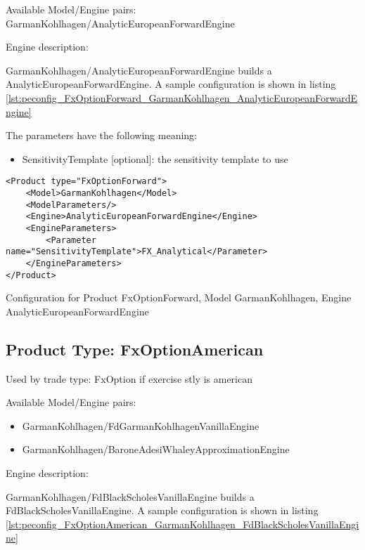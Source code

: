 Available Model/Engine pairs: GarmanKohlhagen/AnalyticEuropeanForwardEngine

Engine description:

GarmanKohlhagen/AnalyticEuropeanForwardEngine builds a AnalyticEuropeanForwardEngine. A sample configuration is shown in listing
\ref{lst:peconfig_FxOptionForward_GarmanKohlhagen_AnalyticEuropeanForwardEngine}

The parameters have the following meaning:

\begin{itemize}
\item SensitivityTemplate [optional]: the sensitivity template to use
\end{itemize}

\begin{longlisting}
\begin{verbatim}
<Product type="FxOptionForward">
    <Model>GarmanKohlhagen</Model>
    <ModelParameters/>
    <Engine>AnalyticEuropeanForwardEngine</Engine>
    <EngineParameters>
        <Parameter name="SensitivityTemplate">FX_Analytical</Parameter>
    </EngineParameters>
</Product>
\end{verbatim}
\caption{Configuration for Product FxOptionForward, Model GarmanKohlhagen, Engine AnalyticEuropeanForwardEngine}
\label{lst:peconfig_FxOptionForward_GarmanKohlhagen_AnalyticEuropeanForwardEngine}
\end{longlisting}

\subsection{Product Type: FxOptionAmerican}

Used by trade type: FxOption if exercise stly is american

Available Model/Engine pairs:

\begin{itemize}
\item GarmanKohlhagen/FdGarmanKohlhagenVanillaEngine
\item GarmanKohlhagen/BaroneAdesiWhaleyApproximationEngine
\end{itemize}

Engine description:

GarmanKohlhagen/FdBlackScholesVanillaEngine builds a FdBlackScholesVanillaEngine. A sample configuration is shown in listing
\ref{lst:peconfig_FxOptionAmerican_GarmanKohlhagen_FdBlackScholesVanillaEngine}

